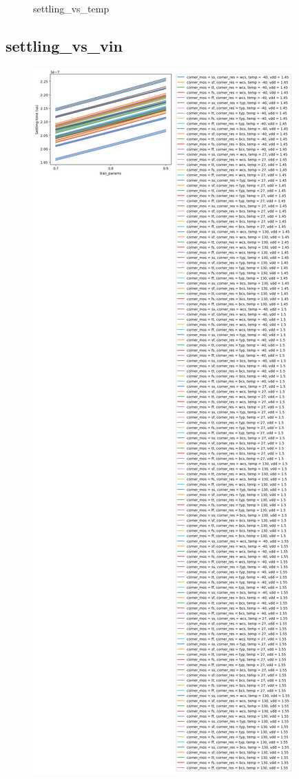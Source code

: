 \documentclass[
  a4paper,
  DIV=11,
  numbers=noendperiod]{scrartcl}
\begin{document}
\begin{tcolorbox}
\begin{figure}[H]
{}

\caption{settling\_vs\_temp}

\end{figure}%

\subsection*{settling\_vs\_vin}\label{settling_vs_vin-1}

\begin{figure}[H]

{\centering \includegraphics{./cace/_docs/ota-improved/schematic/settling_vs_vin.png}

}
\end{figure}
\end{tcolorbox}
\end{document}
